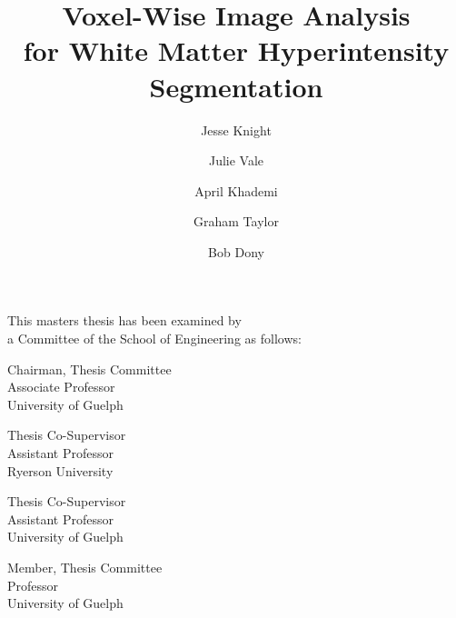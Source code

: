 \title{Voxel-Wise Image Analysis\\for White Matter Hyperintensity Segmentation}
\author{Jesse Knight}
\degreemonth{}
\copyrightnoticetext{}
\maketitle
\cleardoublepage
\setcounter{page}{1}
\begin{abstractpage}

\end{abstractpage}
\cleardoublepage
\begin{titlepage}
  \begin{large}
    This masters thesis has been examined by \\ a Committee of the School of Engineering as follows:
    \signature{Julie Vale}{Chairman, Thesis Committee \\
      Associate Professor\\
      University of Guelph}
    \signature{April Khademi}{Thesis Co-Supervisor \\
      Assistant Professor\\
      Ryerson University}
    \signature{Graham Taylor}{Thesis Co-Supervisor \\
      Assistant Professor\\
      University of Guelph}
    \signature{Bob Dony}{Member, Thesis Committee \\
      Professor\\
      University of Guelph}
  \end{large}
\end{titlepage}
